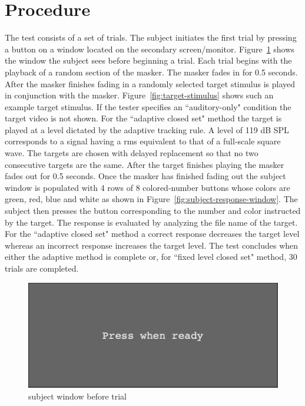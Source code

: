 \documentclass[11pt,pdftex,letterpaper]{article}
\begin{document}
\section{Procedure}
The test consists of a set of trials. The subject initiates the first trial by pressing a button on a window located on the secondary screen/monitor. Figure~\ref{fig:subject-ready-window} shows the window the subject sees before beginning a trial. Each trial begins with the playback of a random section of the masker. The masker fades in for 0.5 seconds. After the masker finishes fading in a randomly selected target stimulus is played in conjunction with the masker. Figure~\ref{fig:target-stimulus} shows such an example target stimulus.
If the tester specifies an ``auditory-only" condition the target video is not shown. For the ``adaptive closed set" method the target is played at a level dictated by the adaptive tracking rule. A level of 119 dB SPL corresponds to a signal having a rms equivalent to that of a full-scale square wave. The targets are chosen with delayed replacement so that no two consecutive targets are the same. After the target finishes playing the masker fades out for 0.5 seconds. Once the masker has finished fading out the subject window is populated with 4 rows of 8 colored-number buttons whose colors are green, red, blue and white as shown in Figure~\ref{fig:subject-response-window}. The subject then presses the button corresponding to the number and color instructed by the target. The response is evaluated by analyzing the file name of the target. For the ``adaptive closed set" method a correct response decreases the target level whereas an incorrect response increases the target level. The test concludes when either the adaptive method is complete or, for ``fixed level closed set" method, 30 trials are completed.

\begin{figure}
\centering
\includegraphics[width = 0.9\linewidth]{subject-ready-window.png}
\caption{subject window before trial}
\label{fig:subject-ready-window}
\end{figure}
\end{document}
